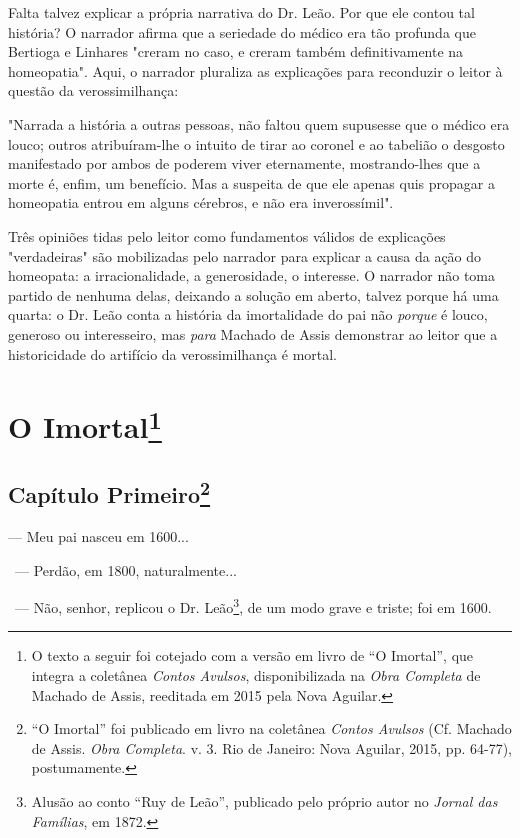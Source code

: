 Falta talvez explicar a própria narrativa do Dr. Leão. Por que ele
contou tal história? O narrador afirma que a seriedade do médico era tão
profunda que Bertioga e Linhares "creram no caso, e creram também
definitivamente na homeopatia". Aqui, o narrador pluraliza as
explicações para reconduzir o leitor à questão da verossimilhança:

"Narrada a história a outras pessoas, não faltou quem supusesse que o
médico era louco; outros atribuíram-lhe o intuito de tirar ao coronel e
ao tabelião o desgosto manifestado por ambos de poderem viver
eternamente, mostrando-lhes que a morte é, enfim, um benefício. Mas a
suspeita de que ele apenas quis propagar a homeopatia entrou em alguns
cérebros, e não era inverossímil".

Três opiniões tidas pelo leitor como fundamentos válidos de explicações
"verdadeiras" são mobilizadas pelo narrador para explicar a causa da
ação do homeopata: a irracionalidade, a generosidade, o interesse. O
narrador não toma partido de nenhuma delas, deixando a solução em
aberto, talvez porque há uma quarta: o Dr. Leão conta a história da
imortalidade do pai não \emph{porque} é louco, generoso ou interesseiro,
mas \emph{para} Machado de Assis demonstrar ao leitor que a
historicidade do artifício da verossimilhança é mortal.

\chapter{O Imortal\footnote[*]{O texto a seguir foi cotejado com a versão
  em livro de ``O Imortal'', que integra a coletânea \emph{Contos
  Avulsos}, disponibilizada na \emph{Obra Completa} de Machado de Assis,
  reeditada em 2015 pela Nova Aguilar.}}

\section{Capítulo Primeiro\protect\footnote{``O
  Imortal'' foi publicado em livro na coletânea \emph{Contos Avulsos}
  (Cf. Machado de Assis. \emph{Obra Completa}. v. 3. Rio de Janeiro:
  Nova Aguilar, 2015, pp. 64-77), postumamente.}}

--- Meu pai nasceu em 1600...

~--- Perdão, em 1800, naturalmente...

~--- Não, senhor, replicou o Dr. Leão\footnote{Alusão ao conto ``Ruy de
  Leão'', publicado pelo próprio autor no \emph{Jornal das Famílias}, em
  1872.}, de um modo grave e triste; foi em 1600.

